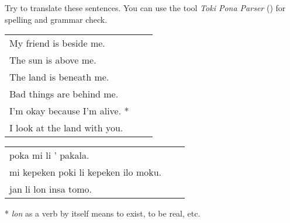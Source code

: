 Try to translate these sentences. 
You can use the tool \textit{Toki Pona Parser} (\cite{www:rowa:02}) for spelling and grammar check. 

\begin{supertabular}{p{5,5cm}|ll}
My friend is beside me. && \\ %
The sun is above me. && \\ %
The land is beneath me. && \\ %
Bad things are behind me. && \\ %
I'm okay because I'm alive. * && \\ %
I look at the land with you. && \\ %
\end{supertabular}

\begin{supertabular}{p{5,5cm}|ll}
poka mi li ' pakala. && \\ %
mi kepeken poki li kepeken ilo moku. && \\ %
jan li lon insa tomo. && \\ %
\end{supertabular} 

* \textit{lon} as a verb by itself means to exist, to be real, etc. 
% 
